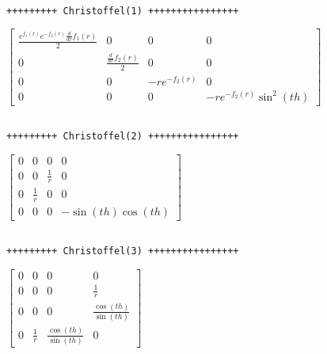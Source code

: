 \documentclass[11pt]{article}
\begin{document}
    
    \begin{Verbatim}[commandchars=\\\{\}]

+++++++++ Christoffel(1) ++++++++++++++++
    \end{Verbatim}

    $\displaystyle \left[\begin{matrix}\frac{e^{f_{1}{\left(r \right)}} e^{- f_{2}{\left(r \right)}} \frac{d}{d r} f_{1}{\left(r \right)}}{2} & 0 & 0 & 0\\0 & \frac{\frac{d}{d r} f_{2}{\left(r \right)}}{2} & 0 & 0\\0 & 0 & - r e^{- f_{2}{\left(r \right)}} & 0\\0 & 0 & 0 & - r e^{- f_{2}{\left(r \right)}} \sin^{2}{\left(th \right)}\end{matrix}\right]$

    
    \begin{Verbatim}[commandchars=\\\{\}]

+++++++++ Christoffel(2) ++++++++++++++++
    \end{Verbatim}

    $\displaystyle \left[\begin{matrix}0 & 0 & 0 & 0\\0 & 0 & \frac{1}{r} & 0\\0 & \frac{1}{r} & 0 & 0\\0 & 0 & 0 & - \sin{\left(th \right)} \cos{\left(th \right)}\end{matrix}\right]$

    
    \begin{Verbatim}[commandchars=\\\{\}]

+++++++++ Christoffel(3) ++++++++++++++++
    \end{Verbatim}

    $\displaystyle \left[\begin{matrix}0 & 0 & 0 & 0\\0 & 0 & 0 & \frac{1}{r}\\0 & 0 & 0 & \frac{\cos{\left(th \right)}}{\sin{\left(th \right)}}\\0 & \frac{1}{r} & \frac{\cos{\left(th \right)}}{\sin{\left(th \right)}} & 0\end{matrix}\right]$

    
    \begin{Verbatim}[commandchars=\\\{\}]

    \end{Verbatim}
\end{document}

